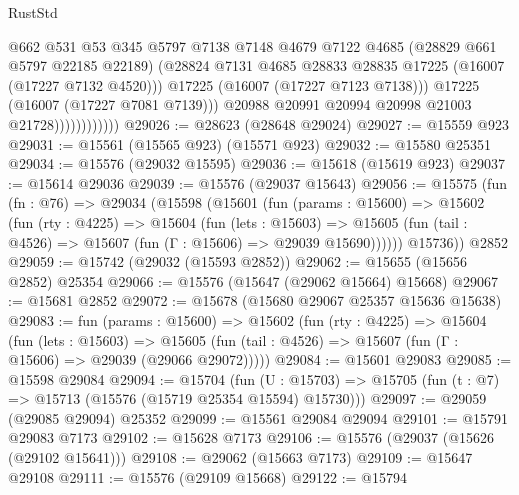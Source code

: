 \begin{lexlean}{RustStd}
\begin{coremodule}
                                @662
                                @531
                                @53
                                @345
                                @5797
                                @7138
                                @7148
                                @4679
                                @7122
                                @4685
                                (@28829 @661 @5797 @22185 @22189)
                                (@28824
                                  @7131
                                  @4685
                                  @28833
                                  @28835
                                  @17225
                                  (@16007 (@17227 @7132 @4520)))
                                @17225
                                (@16007 (@17227 @7123 @7138)))
                              @17225
                              (@16007 (@17227 @7081 @7139)))
                            @20988
                            @20991
                            @20994
                            @20998
                            @21003
                            @21728))))))))))))
@29026 := @28623 (@28648 @29024)
@29027 := @15559 @923
@29031 := @15561 (@15565 @923) (@15571 @923)
@29032 := @15580 @25351
@29034 := @15576 (@29032 @15595)
@29036 := @15618 (@15619 @923)
@29037 := @15614 @29036
@29039 := @15576 (@29037 @15643)
@29056 := @15575
    (fun (fn : @76) =>
    @29034
      (@15598
        (@15601
          (fun (params : @15600) =>
          @15602
            (fun (rty : @4225) =>
            @15604
              (fun (lets : @15603) =>
              @15605 (fun (tail : @4526) => @15607 (fun (Γ : @15606) => @29039 @15690))))))
        @15736))
    @2852
@29059 := @15742 (@29032 (@15593 @2852))
@29062 := @15655 (@15656 @2852) @25354
@29066 := @15576 (@15647 (@29062 @15664) @15668)
@29067 := @15681 @2852
@29072 := @15678 (@15680 @29067 @25357 @15636 @15638)
@29083 := fun (params : @15600) =>
  @15602
    (fun (rty : @4225) =>
    @15604
      (fun (lets : @15603) =>
      @15605 (fun (tail : @4526) => @15607 (fun (Γ : @15606) => @29039 (@29066 @29072)))))
@29084 := @15601 @29083
@29085 := @15598 @29084
@29094 := @15704
    (fun (U : @15703) => @15705 (fun (t : @7) => @15713 (@15576 (@15719 @25354 @15594) @15730)))
@29097 := @29059 (@29085 @29094) @25352
@29099 := @15561 @29084 @29094
@29101 := @15791 @29083 @7173
@29102 := @15628 @7173
@29106 := @15576 (@29037 (@15626 (@29102 @15641)))
@29108 := @29062 (@15663 @7173)
@29109 := @15647 @29108
@29111 := @15576 (@29109 @15668)
@29122 := @15794

\end{coremodule}
\end{lexlean}
